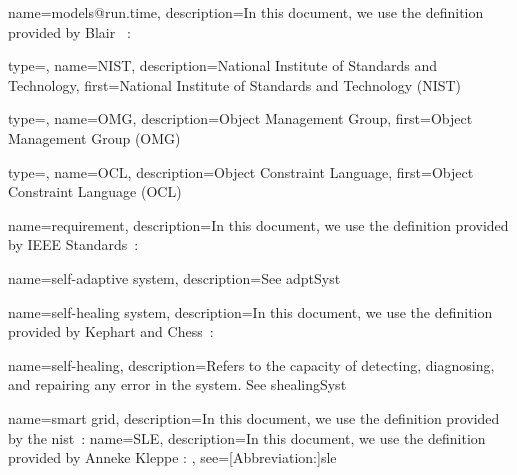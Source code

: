 {
	name={models@run.time},
	description={In this document, we use the definition provided by Blair \etal~\cite{DBLP:journals/computer/BlairBF09}: }
}

{
	type=\acronymtype,
	name={NIST},
	description={National Institute of Standards and Technology},
	first={National Institute of Standards and Technology (NIST)}
}

{
	type=\acronymtype,
	name={OMG},
	description={Object Management Group},
	first={Object Management Group (OMG)}
}

{
	type=\acronymtype,
	name={OCL},
	description={Object Constraint Language},
	first={Object Constraint Language (OCL)}
}


{
	name={requirement},
	description={In this document, we use the definition provided by IEEE Standards~\cite{iso2017systems}: }
}

{
	name={self-adaptive system},
	description={See \gls{adptSyst}}
}

{
	name={self-healing system},
	description={In this document, we use the definition provided by Kephart and Chess~\cite{DBLP:journals/computer/KephartC03}: }
}

{
	name={self-healing},
	description={Refers to the capacity of detecting, diagnosing, and repairing any error in the system. See \gls{shealingSyst}}
}

{
	name={smart grid},
	description={In this document, we use the definition provided by the \gls{nist}~\cite{NIST:SmartGrid:Def:What}: }
}
{
	name={SLE},
 	description={In this document, we use the definition provided by Anneke Kleppe \cite{kleppe2008software}: },
 	see=[Abbreviation:]{sle}
}

